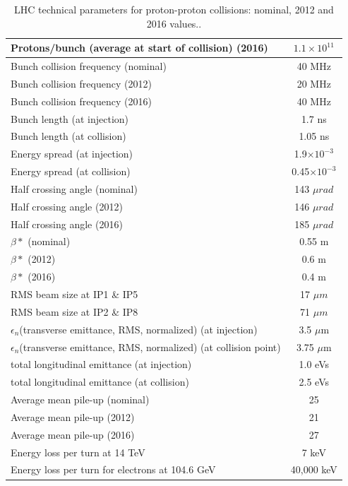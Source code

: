 {{{\begin{table}
\begin{tabular}[!htbp]{l c}
Protons/bunch (average at start of collision) (2016)  &   $1.1 \times 10^{11}$ \\
\hline
Bunch collision frequency (nominal)         &   40 MHz  \\
Bunch collision frequency (2012)            &   20 MHz  \\
Bunch collision frequency (2016)            &   40 MHz  \\
\hline
Bunch length (at injection)   &   1.7 ns \\
Bunch length (at collision)   &   1.05 ns \\
Energy spread (at injection)   &   1.9$\times 10^{-3}$ \\
Energy spread (at collision)   &   0.45$\times 10^{-3}$  \\
\hline
Half crossing angle  (nominal)   & 143 $\mu rad$ \\
Half crossing angle  (2012)   & 146 $\mu rad$ \\
Half crossing angle  (2016)   & 185 $\mu rad$ \\
\hline
$\beta *$  (nominal) &   0.55 m\\
$\beta *$   (2012)&   0.6 m\\
$\beta *$   (2016)&   0.4 m\\
\hline
RMS beam size at IP1 \& IP5 &   17 $\mu m$ \\
RMS beam size at IP2 \& IP8 &   71 $\mu m$ \\
\hline
$\epsilon_n$(transverse emittance, RMS, normalized) (at injection) &   3.5 $\mu$m\\
$\epsilon_n$(transverse emittance, RMS, normalized) (at collision point) &   3.75 $\mu$m\\
\hline
total longitudinal emittance (at injection) & 1.0 eVs \\
total longitudinal emittance (at collision) & 2.5 eVs \\
\hline
Average mean pile-up (nominal) &   25 \\
Average mean pile-up (2012) &    21 \\
Average mean pile-up (2016) &    27 \\
\hline
Energy loss per turn at 14 TeV              &   7 keV   \\
Energy loss per turn for electrons at 104.6 GeV          &  40,000 keV     \\
\end{tabular}
\caption{LHC technical parameters for proton-proton collisions: nominal, 2012 and 2016 values.\cite{Bruce2016, Schoerner-Sadenius2015, LHC-parameters-2016, LHC-tdr-vol1, cms-lumi-public-results}.}
\label{table:LHC-parameters}
\end{table}

}}}
